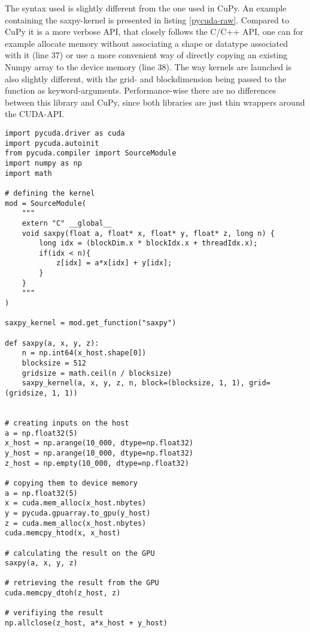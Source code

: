 \documentclass[english,11pt,a4paper,table]{article} %
\begin{document}
The syntax used is slightly different from the one used in CuPy.
An example containing the saxpy-kernel is presented in listing \ref{pycuda-raw}.
Compared to CuPy it is a more verbose API, that closely follows the C/C++ API, one can for example allocate memory without associating a shape or datatype associated with it (line 37) or use a more convenient way of directly copying an existing Numpy array to the device memory (line 38).
The way kernels are launched is also slightly different, with the grid- and blockdimension being passed to the function as keyword-arguments.
Performance-wise there are no differences between this library and CuPy, since both libraries are just thin wrappers around the CUDA-API.

\begin{verbatim}
import pycuda.driver as cuda
import pycuda.autoinit
from pycuda.compiler import SourceModule
import numpy as np
import math

# defining the kernel
mod = SourceModule(
    """
    extern "C" __global__
    void saxpy(float a, float* x, float* y, float* z, long n) {
        long idx = (blockDim.x * blockIdx.x + threadIdx.x);
        if(idx < n){
            z[idx] = a*x[idx] + y[idx];
        }
    }
    """
)

saxpy_kernel = mod.get_function("saxpy")

def saxpy(a, x, y, z):
    n = np.int64(x_host.shape[0])
    blocksize = 512
    gridsize = math.ceil(n / blocksize)
    saxpy_kernel(a, x, y, z, n, block=(blocksize, 1, 1), grid=(gridsize, 1, 1))


# creating inputs on the host
a = np.float32(5)
x_host = np.arange(10_000, dtype=np.float32)
y_host = np.arange(10_000, dtype=np.float32)
z_host = np.empty(10_000, dtype=np.float32)

# copying them to device memory
a = np.float32(5)
x = cuda.mem_alloc(x_host.nbytes)
y = pycuda.gpuarray.to_gpu(y_host)
z = cuda.mem_alloc(x_host.nbytes)
cuda.memcpy_htod(x, x_host)

# calculating the result on the GPU
saxpy(a, x, y, z)

# retrieving the result from the GPU
cuda.memcpy_dtoh(z_host, z)

# verifiying the result
np.allclose(z_host, a*x_host + y_host)
\end{verbatim}
\end{document}
